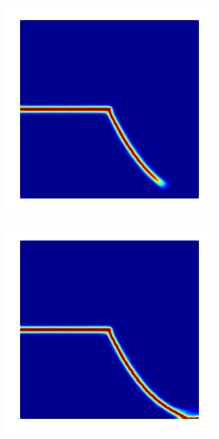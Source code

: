 \begin{figure}[htb!]
\begin{subfigure}[b]{0.21\textwidth}
    \caption{}
  \end{subfigure}
  \begin{subfigure}[b]{0.21\textwidth}
    \centering
    \includegraphics[width=\textwidth,scale=0.5]{Chapter4/figures/mode2_intact_plate_odd_intermediate.png}
    \caption{}
    \label{fig: Chapter4/mode2_intact_plate_odd_intermediate}
  \end{subfigure}
  \begin{subfigure}[b]{0.21\textwidth}
    \centering
    \includegraphics[width=\textwidth,scale=0.5]{Chapter4/figures/mode2_intact_plate_odd_final.png}

\end{subfigure}
\end{figure}
